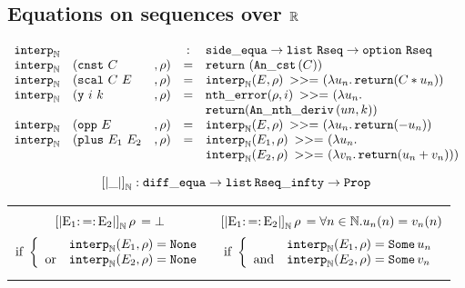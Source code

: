 \subsection{Equations on sequences over $\R$}

\label{interpN}
$$\begin{array}{lllcl}
\IN & & & : & \se \rightarrow \alist{} \Rseq \rightarrow \option{} \Rseq \\
\IN & (\mathtt{cnst}~ C & , \rho) & = & \return~ (\C{}(C))\\
\IN & (\mathtt{scal}~ C ~ E &, \rho) & = & \IN(E, \rho) \bind (\lambda u_n. \return (C * u_n))\\
\IN & (\mathtt{y} ~ i ~ k &, \rho) & = & \ntherr(\rho, i) \bind (\lambda u_n. \\
    & & &   & \return (\Dn{}(un,k)) \\
\IN & (\mathtt{opp} ~E &, \rho) & = & \IN(E,\rho) \bind (\lambda u_n. \return (- u_n))\\
\IN & (\mathtt{plus} ~ E_1 ~ E_2 &, \rho) & = & \IN(E_1,\rho) \bind (\lambda u_n.\\
    & & &   & \IN(E_2,\rho) \bind (\lambda v_n. \return (u_n + v_n)))\\
\end{array}$$

$$\left[\left| \_ \right|\right]_{\N} : \de \rightarrow \alist{}
\mathtt{Rseq\_infty} \rightarrow \Prop$$

\begin{center}
\begin{tabular}{c|c}
\begin{minipage}{0.45\textwidth}
$$\SemN{} = \bot$$
$$\text{if } \left\lbrace
\begin{array}{ll}
& \IN(E_1, \rho) = \None\\
\text{or} & \IN(E_2, \rho) = \None
\end{array}\right.$$
\end{minipage}

& \begin{minipage}{0.45\textwidth}
$$\SemN{} = \forall n \in \N. u_n(n) = v_n(n)$$
$$\text{if } \left\lbrace
\begin{array}{ll}
& \IN(E_1, \rho) = \Some u_n\\
\text{and} & \IN(E_2, \rho) = \Some v_n
\end{array}\right.$$
\end{minipage}

\end{tabular}
\end{center}
